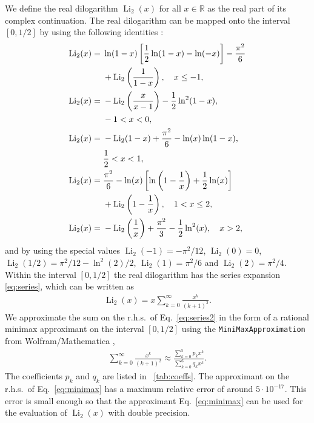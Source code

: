 \documentclass[10pt,DIV=16,twocolumn,numbers=noenddot]{scrartcl}
\newcommand{\Li}{\operatorname{Li}_2}
\newcommand{\tabref}[1]{\tablename~\ref{#1}}
\begin{document}
We define the real dilogarithm $\Li(x)$ for all $x\in\mathbb{R}$ as
the real part of its complex continuation.  The real dilogarithm can
be mapped onto the interval $[0,1/2]$ by using the following
identities \cite{lewin}:
%
\begin{align}
  \Li(x) ={}& \ln(1-x)\left[\frac{1}{2}\ln(1-x) - \ln(-x)\right] - \frac{\pi^2}{6}
              \notag \\ &+\Li\left(\frac{1}{1-x}\right), \quad x\leq -1, \\
  \Li(x) ={}& -\Li\left(\frac{x}{x-1}\right) - \frac{1}{2}\ln^2(1-x),
              \notag \\ & -1<x<0, \\
  \Li(x) ={}& -\Li(1-x) + \frac{\pi^2}{6} - \ln(x) \ln(1-x),
              \notag \\ &\frac{1}{2}<x<1, \\
  \Li(x) ={}& \frac{\pi^2}{6} - \ln(x)\left[\ln\left(1-\frac{1}{x}\right) + \frac{1}{2}\ln(x)\right]
              \notag \\ &+ \Li\left(1-\frac{1}{x}\right), \quad 1<x\leq 2, \\
  \Li(x) ={}& -\Li\left(\frac{1}{x}\right) + \frac{\pi^2}{3} - \frac{1}{2} \ln^2(x), \quad x>2,
\end{align}
%
and by using the special values $\Li(-1)=-\pi^2/12$, $\Li(0)=0$,
$\Li(1/2)=\pi^2/12-\ln^2(2)/2$, $\Li(1)=\pi^2/6$ and $\Li(2)=\pi^2/4$.
Within the interval $[0,1/2]$ the real dilogarithm has the series
expansion \eqref{eq:series}, which can be written as
%
\begin{align}
  \Li(x) = x \sum_{k=0}^\infty \frac{x^{k}}{(k+1)^2}.
  \label{eq:series2}
\end{align}
%
We approximate the sum on the r.h.s.\ of Eq.~\eqref{eq:series2} in the
form of a rational minimax approximant on the interval $[0,1/2]$ using
the \texttt{MiniMaxApproximation} from Wolfram/Mathematica
\cite{mathematica},
%
\begin{align}
  \sum_{k=0}^\infty \frac{x^{k}}{(k+1)^2} \approx
  \frac{\sum_{k=0}^5 p_kx^k}{\sum_{k=0}^6 q_kx^k}.
  \label{eq:minimax}
\end{align}
%
The coefficients $p_k$ and $q_k$ are listed in \tabref{tab:coeffs}.
The approximant on the r.h.s.\ of Eq.~\eqref{eq:minimax} has a maximum
relative error of around $5\cdot 10^{-17}$.  This error is small
enough so that the approximant Eq.~\eqref{eq:minimax} can be used for
the evaluation of $\Li(x)$ with double precision.
%
\end{document}
